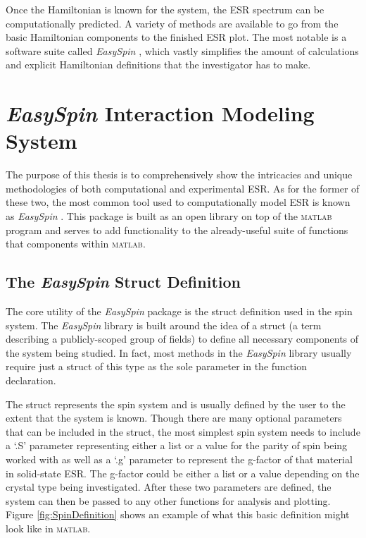 \documentclass[oneside, noacknowlegments]{BYUPhys}
\begin{document}
Once the Hamiltonian is known for the system, the ESR spectrum can be computationally predicted. A variety of methods are available to go from the basic Hamiltonian components to the finished ESR plot. The most notable is a software suite called \textit{EasySpin} \cite{RefWorks:doc:58929a02e4b0d4c09201f91b}, which vastly simplifies the amount of calculations and explicit Hamiltonian definitions that the investigator has to make.

\section{\textit{EasySpin} Interaction Modeling System}

The purpose of this thesis is to comprehensively show the intricacies and unique methodologies of both computational and experimental ESR. As for the former of these two, the most common tool used to computationally model ESR is known as \textit{EasySpin} \cite{RefWorks:doc:58929a02e4b0d4c09201f91b}. This package is built as an open library on top of the \textsc{matlab} program and serves to add functionality to the already-useful suite of functions that components within \textsc{matlab}.

\subsection{The \textit{EasySpin} Struct Definition}

The core utility of the \textit{EasySpin} package is the struct definition used in the spin system. The \textit{EasySpin} library is built around the idea of a struct (a term describing a publicly-scoped group of fields) to define all necessary components of the system being studied. In fact, most methods in the \textit{EasySpin} library usually require just a struct of this type as the sole parameter in the function declaration.

The struct represents the spin system and is usually defined by the user to the extent that the system is known. Though there are many optional parameters that can be included in the struct, the most simplest spin system needs to include a `.S' parameter representing either a list or a value for the parity of spin being worked with as well as a `.g' parameter to represent the g-factor of that material in solid-state ESR. The g-factor could be either a list or a value depending on the crystal type being investigated. After these two parameters are defined, the system can then be passed to any other functions for analysis and plotting. Figure \ref{fig:SpinDefinition} shows an example of what this basic definition might look like in \textsc{matlab}.
\end{document}
